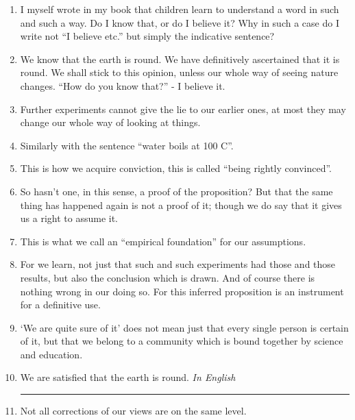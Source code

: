 \documentclass{book}
\begin{document}
\begin{enumerate}
\item
I myself wrote in my book that children learn to understand a word in such and
such a way. Do I know that, or do I believe it? Why in such a case do I write
not ``I believe etc.'' but simply the indicative sentence?

\item
We know that the earth is round. We have definitively ascertained that it is
round.  We shall stick to this opinion, unless our whole way of seeing nature
changes. ``How do you know that?'' - I believe it.

\item
Further experiments cannot give the lie to our earlier ones, at most they may
change our whole way of looking at things.

\item
Similarly with the sentence ``water boils at 100 C''.

\item
This is how we acquire conviction, this is called ``being rightly convinced''.

\item
So hasn't one, in this sense, a proof of the proposition? But that the same
thing has happened again is not a proof of it; though we do say that it gives
us a right to assume it.

\item
This is what we call an ``empirical foundation'' for our assumptions.

\item
For we learn, not just that such and such experiments had those and those
results, but also the conclusion which is drawn. And of course there is nothing
wrong in our doing so. For this inferred proposition is an instrument for a
definitive use.

\item
`We are quite sure of it' does not mean just that every single person is
certain of it, but that we belong to a community which is bound together by
science and education.

\item
We are satisfied that the earth is round. \emph{In English}

\begin{center}\rule{0.5\linewidth}{\linethickness}\end{center}

\item
Not all corrections of our views are on the same level.


\end{enumerate}
\end{document}
